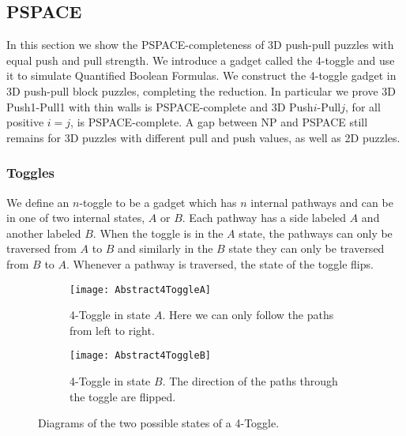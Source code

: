 \subsection{PSPACE}
\label{3DPSPACE}
In this section we show the PSPACE-completeness of 3D push-pull puzzles with equal push and pull strength. We introduce a gadget called the 4-toggle and use it to simulate Quantified Boolean Formulas\cite{NPBook}. We construct the 4-toggle gadget in 3D push-pull block puzzles, completing the reduction. In particular we prove 3D Push1-Pull1 with thin walls is PSPACE-complete and 3D Push$i$-Pull$j$, for all positive $i=j$, is PSPACE-complete. A gap between NP and PSPACE still remains for 3D puzzles with different pull and push values, as well as 2D puzzles. 


\subsubsection{Toggles}
We define an $n$-toggle to be a gadget which has $n$ internal pathways and can be in one of two internal states, $A$ or $B$. Each pathway has a side labeled $A$ and another labeled $B$. When the toggle is in the $A$ state, the pathways can only be traversed from $A$ to $B$ and similarly in the $B$ state they can only be traversed from $B$ to $A$. Whenever a pathway is traversed, the state of the toggle flips.

\begin{figure}[!ht]
\centering
\begin{subfigure}[t]{0.45\textwidth}
  \centering
    \texttt{[image: Abstract4ToggleA]}
    \caption{4-Toggle in state $A$. Here we can only follow the paths from left to right.}
    \label{fig:Abstract4ToggleA}
\end{subfigure}
\begin{subfigure}[t]{0.45\textwidth}
  \centering
    \texttt{[image: Abstract4ToggleB]}
    \caption{4-Toggle in state $B$. The direction of the paths through the toggle are flipped.}
    \label{fig:Abstract4ToggleB}
\end{subfigure}
\caption{Diagrams of the two possible states of a 4-Toggle.}
\end{figure}

